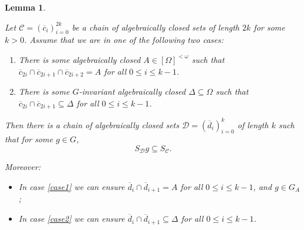 \documentclass[10pt,a4paper]{amsart}
\newcommand{\nn}[0]{S}
\newcommand{\C}[0]{\mathcal{C}}
\newcommand{\D}[0]{\mathcal{D}}
\newcommand{\fps}[1]{[#1]^{<\omega}}
\renewcommand\leq{\leqslant}
\theoremstyle{plain}
\newtheorem{lemma}[theorem]{Lemma}
\theoremstyle{remark}
\begin{document}
  \begin{lemma}\label{skipping terms}

        Let $\C=(\overline{c}_i)_{i=0}^{2k}$ be a  chain of algebraically closed sets of length $2k$ for some $k>0$. Assume that we are in one of the following two cases:
	    \begin{enumerate}[label=(\Roman*)]
        \item \label{case1} {There is some algebraically closed $A\in\fps{\Omega}$ such that  $\overline{c}_{2i}\cap \overline{c}_{2i+1}\cap \overline{c}_{2i+2}=A$ for all $0\leq i\leq k-1$.}   
	    	\item \label{case2} 
            {There is some $G$-invariant algebraically closed $\Delta\subseteq\Omega$ such that $\overline{c}_{2i}\cap \overline{c}_{2i+1}\subseteq\Delta$ for all $0\leq i\leq k-1$.} 
            
	    \end{enumerate}
	    Then there is a chain of algebraically closed sets $\D=(\overline{d}_{i})_{i=0}^{k}$ of length $k$ such that for some $g\in G$, 
	    \begin{equation*}
	    	\nn_{\mathcal{D}}{g}\subseteq \nn_{\C}.
	    \end{equation*}

         Moreover: 
	     \begin{itemize}
	    	\item In case \ref{case1} we can ensure $\overline{d}_{i}\cap\overline{d}_{i+1}=A$ for all $0\leq i\leq k-1$, and $g\in G_{A}$;
            \item In case \ref{case2}  we can ensure $\overline{d}_{i}\cap \overline{d}_{i+1}\subseteq\Delta$ for all $0\leq i\leq k-1$.
	    \end{itemize}
  \end{lemma} 
\end{document}
